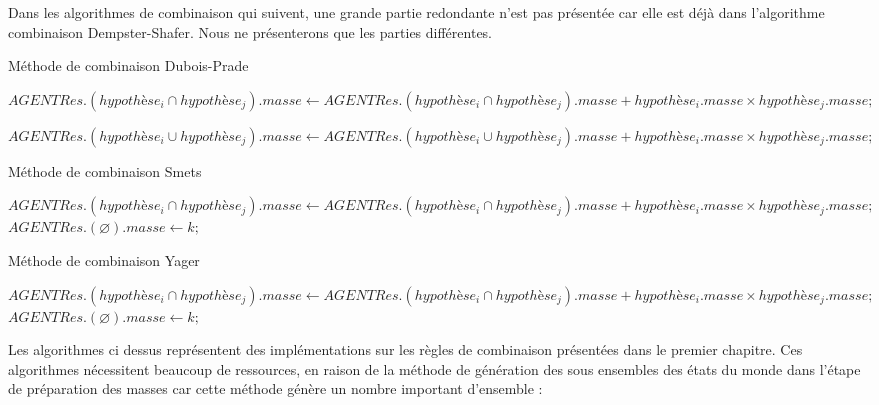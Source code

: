 Dans les algorithmes de combinaison qui suivent, une grande partie redondante n'est pas présentée car elle est déjà dans l'algorithme combinaison Dempster-Shafer. Nous ne présenterons que les parties différentes.

\vspace{1em}

\begin{algorithm}[H]
\caption{Méthode de combinaison Dubois-Prade}
\setcounter{AlgoLine}{3}
$AGENTRes.(hypothèse_{i} \cap hypothèse_{j}).masse \gets AGENTRes.(hypothèse_{i} \cap hypothèse_{j}).masse + hypothèse_{i}.masse \times hypothèse_{j}.masse ;$

$AGENTRes.(hypothèse_{i} \cup hypothèse_{j}).masse \gets AGENTRes.(hypothèse_{i} \cup hypothèse_{j}).masse + hypothèse_{i}.masse \times hypothèse_{j}.masse ;$
\end{algorithm}
\newpage
\vspace*{3em}
\begin{algorithm}[H]
\setcounter{AlgoLine}{3}
\caption{Méthode de combinaison Smets}

$AGENTRes.(hypothèse_{i} \cap hypothèse_{j}).masse \gets AGENTRes.(hypothèse_{i} \cap hypothèse_{j}).masse + hypothèse_{i}.masse \times hypothèse_{j}.masse ;$
$AGENTRes.(\varnothing ).masse \gets k;$
\end{algorithm}
\vspace{6em}
\begin{algorithm}[H]
\setcounter{AlgoLine}{9}
\caption{Méthode de combinaison Yager}
$AGENTRes.(hypothèse_{i} \cap hypothèse_{j}).masse \gets AGENTRes.(hypothèse_{i} \cap hypothèse_{j}).masse + hypothèse_{i}.masse \times hypothèse_{j}.masse ;$
$AGENTRes.(\varnothing ).masse \gets k;$
\end{algorithm}
\vspace{6em}
Les algorithmes ci dessus représentent des implémentations sur les règles de combinaison présentées dans le premier chapitre. Ces algorithmes nécessitent beaucoup de ressources, en raison de la méthode de génération des sous ensembles des états du monde dans l'étape de préparation des masses car cette méthode génère un nombre important d'ensemble :

